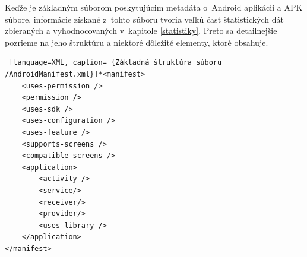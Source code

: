 Keďže  je základným súborom poskytujúcim metadáta o~Android aplikácii a APK súbore, informácie získané z~tohto súboru tvoria veľkú časť štatistických dát zbieraných a vyhodnocovaných v~kapitole \ref{statistiky}. Preto sa detailnejšie pozrieme na jeho štruktúru a niektoré dôležité elementy, ktoré obsahuje.
\begin{lstlisting} [language=XML, caption= {Základná štruktúra súboru /AndroidManifest.xml}]*<manifest>
    <uses-permission />
    <permission />
    <uses-sdk />
    <uses-configuration />  
    <uses-feature />  
    <supports-screens />  
    <compatible-screens />  
    <application>
        <activity />
        <service/>
        <receiver/>
        <provider/>
        <uses-library />
    </application>
</manifest>
\end{lstlisting}

